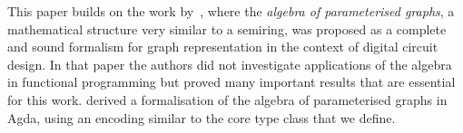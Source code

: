 This paper builds on the work by~\citet{2014_algebra_mokhov}, where
the \emph{algebra of parameterised graphs}, a mathematical
structure very similar to a semiring, was proposed as a complete and sound formalism
for graph representation in the context of digital circuit design. In that paper the
authors did not investigate applications of the algebra in functional programming but
proved many important results that are essential for this work.
\citet{2014_alekseyev_phd} derived a formalisation of the algebra of parameterised
graphs in Agda, using an encoding similar to the core type class that we define.

